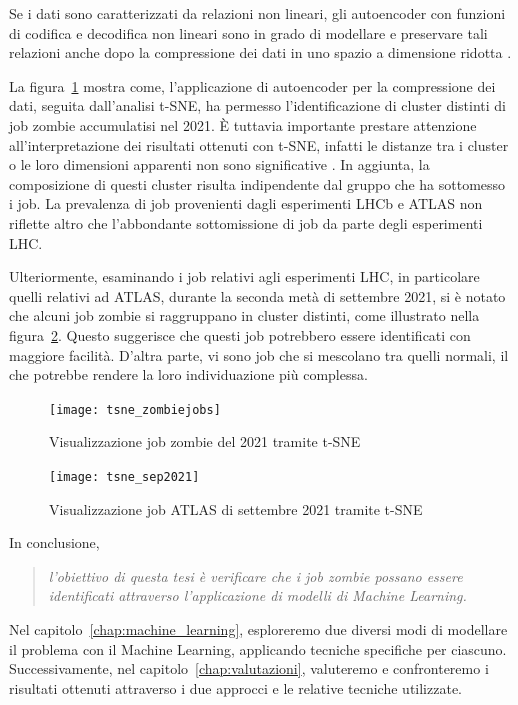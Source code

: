 Se i dati sono caratterizzati da relazioni non lineari, gli autoencoder con
funzioni di codifica e decodifica non lineari sono in grado di modellare e
preservare tali relazioni anche dopo la compressione dei dati in uno spazio a
dimensione ridotta \cite{Goodfellow2016}.

La figura~\ref{fig:tsne_zombiejobs} mostra come, l'applicazione di autoencoder
per la compressione dei dati, seguita dall'analisi t-SNE, ha permesso
l'identificazione di cluster distinti di job zombie accumulatisi nel 2021. È
tuttavia importante prestare attenzione all'interpretazione dei risultati
ottenuti con t-SNE, infatti le distanze tra i cluster o le loro dimensioni
apparenti non sono significative \cite{Wattenberg2016}. In aggiunta, la
composizione di questi cluster risulta indipendente dal gruppo che ha
sottomesso i job. La prevalenza di job provenienti dagli esperimenti LHCb e
ATLAS non riflette altro che l'abbondante sottomissione di job da parte degli
esperimenti LHC.

Ulteriormente, esaminando i job relativi agli esperimenti LHC, in particolare
quelli relativi ad ATLAS, durante la seconda metà di settembre 2021, si è
notato che alcuni job zombie si raggruppano in cluster distinti, come
illustrato nella figura~\ref{fig:tsne_sep2021}. Questo suggerisce che questi
job potrebbero essere identificati con maggiore facilità. D'altra parte, vi
sono job che si mescolano tra quelli normali, il che potrebbe rendere la loro
individuazione più complessa.

\begin{figure}[!hb]
   \centering
   \texttt{[image: tsne\_zombiejobs]}
   \caption{Visualizzazione job zombie del 2021 tramite t-SNE}
   \label{fig:tsne_zombiejobs}
\end{figure}

\begin{figure}[!hb]
   \centering
   \texttt{[image: tsne\_sep2021]}
   \caption{Visualizzazione job ATLAS di settembre 2021 tramite t-SNE}
   \label{fig:tsne_sep2021}
\end{figure}

In conclusione, 
\begin{quote}
    \emph{l'obiettivo di questa tesi è verificare che i job zombie possano
    essere identificati attraverso l'applicazione di modelli di Machine
Learning.}
\end{quote}

Nel capitolo~\ref{chap:machine_learning}, esploreremo due diversi modi di
modellare il problema con il Machine Learning, applicando tecniche specifiche
per ciascuno. Successivamente, nel capitolo~\ref{chap:valutazioni}, valuteremo
e confronteremo i risultati ottenuti attraverso i due approcci e le relative
tecniche utilizzate.
